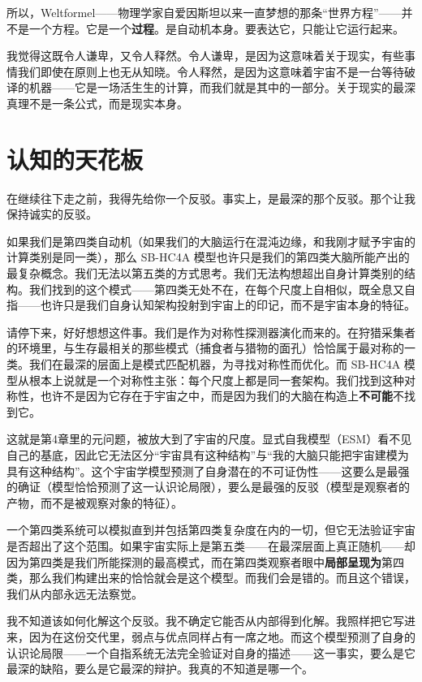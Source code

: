 \documentclass[11pt, twoside, openright]{book}
\begin{document}
所以，Weltformel------物理学家自爱因斯坦以来一直梦想的那条“世界方程”------并不是一个方程。它是一个\textbf{过程}。是自动机本身。要表达它，只能让它运行起来。

我觉得这既令人谦卑，又令人释然。令人谦卑，是因为这意味着关于现实，有些事情我们即使在原则上也无从知晓。令人释然，是因为这意味着宇宙不是一台等待破译的机器------它是一场活生生的计算，而我们就是其中的一部分。关于现实的最深真理不是一条公式，而是现实本身。


\section*{认知的天花板}

在继续往下走之前，我得先给你一个反驳。事实上，是最深的那个反驳。那个让我保持诚实的反驳。

如果我们是第四类自动机（如果我们的大脑运行在混沌边缘，和我刚才赋予宇宙的计算类别是同一类），那么 SB-HC4A 模型也许只是我们的第四类大脑所能产出的最复杂概念。我们无法以第五类的方式思考。我们无法构想超出自身计算类别的结构。我们找到的这个模式------第四类无处不在，在每个尺度上自相似，既全息又自指------也许只是我们自身认知架构投射到宇宙上的印记，而不是宇宙本身的特征。

请停下来，好好想想这件事。我们是作为对称性探测器演化而来的。在狩猎采集者的环境里，与生存最相关的那些模式（捕食者与猎物的面孔）恰恰属于最对称的一类。我们在最深的层面上是模式匹配机器，为寻找对称性而优化。而 SB-HC4A 模型从根本上说就是一个对称性主张：每个尺度上都是同一套架构。我们找到这种对称性，也许不是因为它存在于宇宙之中，而是因为我们的大脑在构造上\textbf{不可能}不找到它。

这就是第4章里的元问题，被放大到了宇宙的尺度。显式自我模型（ESM）看不见自己的基底，因此它无法区分“宇宙具有这种结构”与“我的大脑只能把宇宙建模为具有这种结构”。这个宇宙学模型预测了自身潜在的不可证伪性------这要么是最强的确证（模型恰恰预测了这一认识论局限），要么是最强的反驳（模型是观察者的产物，而不是被观察对象的特征）。

一个第四类系统可以模拟直到并包括第四类复杂度在内的一切，但它无法验证宇宙是否超出了这个范围。如果宇宙实际上是第五类------在最深层面上真正随机------却因为第四类是我们所能探测的最高模式，而在第四类观察者眼中\textbf{局部呈现为}第四类，那么我们构建出来的恰恰就会是这个模型。而我们会是错的。而且这个错误，我们从内部永远无法察觉。

我不知道该如何化解这个反驳。我不确定它能否从内部得到化解。我照样把它写进来，因为在这份交代里，弱点与优点同样占有一席之地。而这个模型预测了自身的认识论局限------一个自指系统无法完全验证对自身的描述------这一事实，要么是它最深的缺陷，要么是它最深的辩护。我真的不知道是哪一个。
\end{document}
